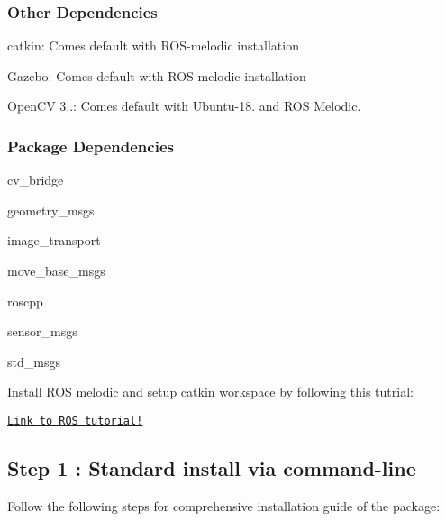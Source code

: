 \subsubsection*{Other Dependencies}


\begin{DoxyEnumerate}
\item catkin\+: Comes default with R\+O\+S-\/melodic installation
\item Gazebo\+: Comes default with R\+O\+S-\/melodic installation
\item Open\+CV 3..\+: Comes default with Ubuntu-\/18. and R\+OS Melodic.
\end{DoxyEnumerate}

\subsubsection*{Package Dependencies}


\begin{DoxyEnumerate}
\item cv\+\_\+bridge
\item geometry\+\_\+msgs
\item image\+\_\+transport
\item move\+\_\+base\+\_\+msgs
\item roscpp
\item sensor\+\_\+msgs
\item std\+\_\+msgs
\end{DoxyEnumerate}

Install R\+OS melodic and setup catkin workspace by following this tutrial\+:
\begin{DoxyEnumerate}
\item \href{http://wiki.ros.org/ROS/Tutorials/InstallingandConfiguringROSEnvironment}{\tt Link to R\+OS tutorial!}
\end{DoxyEnumerate}

\subsection*{Step 1 \+: Standard install via command-\/line}

Follow the following steps for comprehensive installation guide of the package\+:


